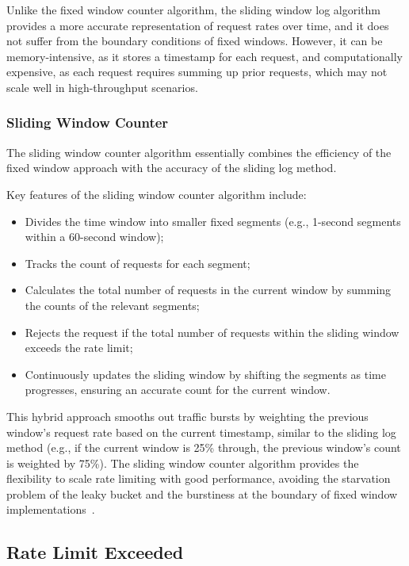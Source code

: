 Unlike the fixed window counter algorithm,
the sliding window log algorithm provides a more accurate representation of request rates over time,
and it does not suffer from the boundary conditions of fixed windows.
However, it can be memory-intensive, as it stores a timestamp for each request, and computationally expensive,
as each request requires summing up prior requests, which may not scale well in high-throughput scenarios.

\subsubsection{Sliding Window Counter}\label{subsubsec:sliding-window-counter-algorithm}

The sliding window counter algorithm essentially combines the efficiency of the fixed window approach with the accuracy of the sliding log method.

Key features of the sliding window counter algorithm include:

\begin{itemize}
    \item Divides the time window into smaller fixed segments (e.g., 1-second segments within a 60-second window);
    \item Tracks the count of requests for each segment;
    \item Calculates the total number of requests in the current window by summing the counts of the relevant segments;
    \item Rejects the request if the total number of requests within the sliding window exceeds the rate limit;
    \item Continuously updates the sliding window by shifting the segments as time progresses, ensuring an accurate count for the current window.
\end{itemize}

This hybrid approach smooths out traffic bursts
by weighting the previous window’s request rate based on the current timestamp,
similar to the sliding log method
(e.g., if the current window is 25\% through, the previous window's count is weighted by 75\%).
The sliding window counter algorithm provides the flexibility to scale rate limiting with good performance,
avoiding the starvation problem of the leaky bucket and the burstiness at the boundary of fixed window implementations~\cite{kong-rate-limiting}.

\subsection{Rate Limit Exceeded}\label{subsec:rate-limiter-exceeded}

